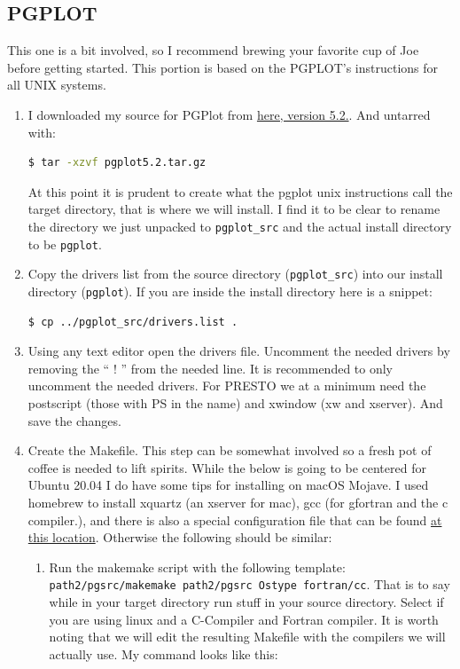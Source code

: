 \documentclass{article}
\begin{document}
\subsection{PGPLOT}
    This one is a bit involved, so I recommend brewing your favorite cup of Joe before getting started. This
    portion is based on the PGPLOT’s instructions for all UNIX systems. 
\begin{enumerate}
    \item \noindent I downloaded my source for PGPlot from \href{ftp://ftp.astro.caltech.edu/pub/pgplot/pgplot5.2.tar.gz}{here, version 5.2.}. And untarred with: 
    \begin{lstlisting}[language=bash]
    $ tar -xzvf pgplot5.2.tar.gz
    \end{lstlisting}
     At this point it is prudent to create what the pgplot unix instructions call the target directory, that is where we will install. I find it to be clear to rename the directory we just unpacked to \texttt{pgplot\_src} and the actual install directory to be \texttt{pgplot}. 
    \item Copy the drivers list from the source directory (\texttt{pgplot\_src}) into our install directory (\texttt{pgplot}). If you are inside the install directory here is a snippet: \noindent
    \begin{lstlisting}[language=bash]
    $ cp ../pgplot_src/drivers.list .
    \end{lstlisting} 
    \item Using any text editor open the drivers file. Uncomment the needed drivers by removing the `` ! '' from the needed line. It is recommended to only uncomment the needed drivers. For PRESTO we at a minimum need the postscript (those with PS in the name) and xwindow (xw and xserver). And save the changes. 
    \item Create the Makefile. This step can be somewhat involved so a fresh pot of coffee is needed to lift spirits. While the below is going to be centered for Ubuntu 20.04 I do have some tips for installing on macOS Mojave. I used homebrew to install xquartz (an xserver for mac), gcc (for gfortran and the c compiler.), and there is also a special configuration file that can be found \href{http://mingus.as.arizona.edu/~bjw/software/pgplot_macosx_conf.tar}{at this location}. Otherwise the following should be similar:
\begin{enumerate}
    \item Run the makemake script with the following template: \texttt{path2/pgsrc/makemake path2/pgsrc Ostype fortran/cc}. That is to say while in your target directory run stuff in your source directory. Select if you are using linux and a C-Compiler and Fortran compiler. It is worth noting that we will edit the resulting Makefile with the compilers we will actually use. My command looks like this: \begin{lstlisting}[language=bash]


\end{lstlisting}
\end{enumerate}
\end{enumerate}
\end{document}
